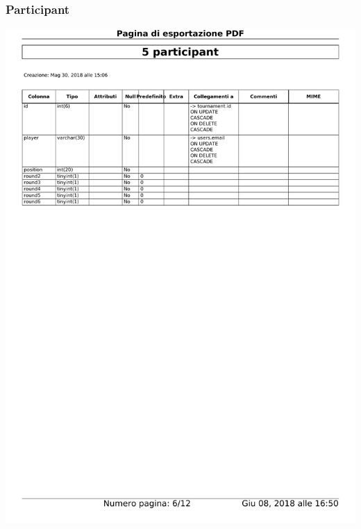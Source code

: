 \documentclass{article}
\begin{document}
    \subsubsection{Participant}
    \begin{center}
        \includegraphics[width=15cm]{images/participant}
    \end{center}
\end{document}
